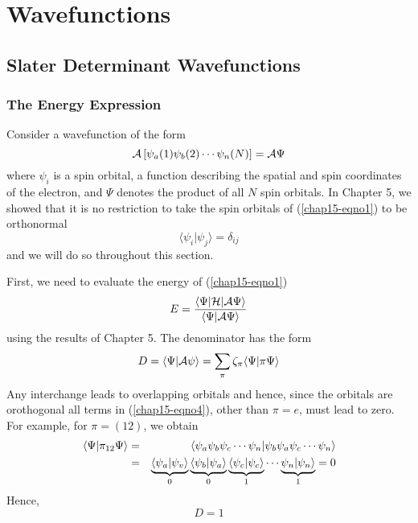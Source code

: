\chapter{Wavefunctions}
\section{Slater Determinant Wavefunctions}
\subsection{The Energy Expression}

Consider a wavefunction of the form
\begin{equation}
{\cal A} \left[ \psi_a (1) \psi_b (2) \cdots \psi_n (N) \right] = 
{\cal A} \Psi
\label{chap15-eqno1}
\end{equation}
where $\psi_i$ is a spin orbital, a function describing the spatial and spin 
coordinates of the electron, and $\Psi$ denotes the product of all $N$ spin 
orbitals.  In Chapter 5, we showed that it is no restriction to take 
the spin orbitals of (\ref{chap15-eqno1}) to be orthonormal
\begin{equation}
\langle \psi_i | \psi_j \rangle = \delta_{ij}
\label{chap15-eqno2}
\end{equation}
and we will do so throughout this section.

First, we need to evaluate the energy of (\ref{chap15-eqno1})
\begin{equation}
E = {\langle \Psi | {\cal H} | {\cal A} \Psi \rangle \over \langle 
\Psi | {\cal A} \Psi \rangle}
\label{chap15-eqno3}
\end{equation}
using the results of Chapter 5.  The denominator has the form
\begin{equation}
D = \langle \Psi | {\cal A} \psi \rangle = \sum_{\pi} \zeta_{\pi} 
\langle \Psi | \pi \Psi \rangle
\label{chap15-eqno4}
\end{equation}
Any interchange leads to overlapping orbitals and hence, since the
orbitals are orothogonal all terms in (\ref{chap15-eqno4}), other than
$\pi = e$, must lead to zero.  For example, for $\pi = (12)$, we
obtain
\begin{eqnarray}
\langle \Psi | \pi_{12} \Psi \rangle &=& \langle \psi_a \psi_b \psi_c 
\cdots \psi_n | \psi_b \psi_a \psi_c \cdots \psi_n \rangle\cr
&=& \underbrace{\langle \psi_a | \psi_v \rangle}_{0} 
\underbrace{\langle \psi_b | \psi_a \rangle}_{0} \underbrace{\langle 
\psi_c | \psi_c \rangle}_{1} \cdots \underbrace{\psi_n | \psi_n 
\rangle}_{1} = 0
\end{eqnarray}
Hence,
\begin{equation}
D = 1
\label{chap15-eqno5}
\end{equation}

